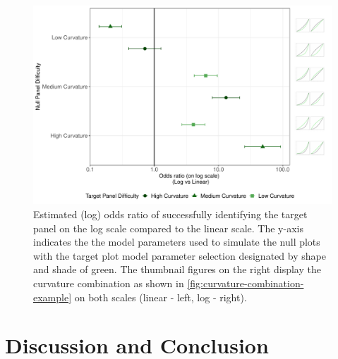 \documentclass[12pt]{article}
\begin{document}
\begin{figure}[tbp]

{\centering \includegraphics[width=\linewidth,]{logarithmic-lineups_files/figure-latex/odds-ratio-plot-1} 

}

\caption[Lineups log(odds) results]{Estimated (log) odds ratio of successfully identifying the target panel on the log scale compared to the linear scale. The y-axis indicates the the model parameters used to simulate the null plots with the target plot model parameter selection designated by shape and shade of green. The thumbnail figures on the right display the curvature combination as shown in \cref{fig:curvature-combination-example} on both scales (linear - left, log - right).}\label{fig:odds-ratio-plot}
\end{figure}

\hypertarget{discussion-and-conclusion}{%
\section{Discussion and Conclusion}\label{discussion-and-conclusion}}
\end{document}
